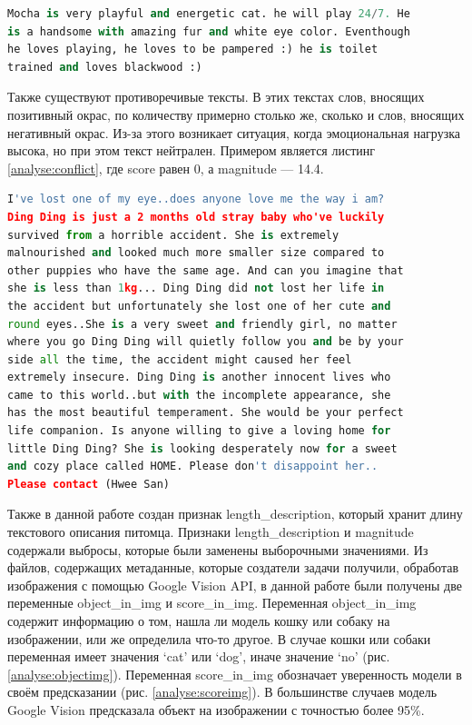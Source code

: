 \documentclass[14pt]{mmcs_article}
\begin{document}
\begin{lstlisting}[language=Python, caption={Пример позитивно окрашенного текста}, label=analyse:pos]
Mocha is very playful and energetic cat. he will play 24/7. He 
is a handsome with amazing fur and white eye color. Eventhough 
he loves playing, he loves to be pampered :) he is toilet 
trained and loves blackwood :)
\end{lstlisting}

Также существуют противоречивые тексты. В этих текстах слов, вносящих позитивный окрас, по количеству примерно столько же, сколько и слов, вносящих негативный окрас. Из-за этого возникает ситуация, когда эмоциональная нагрузка высока, но при этом текст нейтрален. Примером является листинг \ref{analyse:conflict}, где score равен 0, а magnitude — 14.4.

\begin{lstlisting}[language=Python, caption={Пример противоречивого текста}, label=analyse:conflict]
I've lost one of my eye..does anyone love me the way i am? 
Ding Ding is just a 2 months old stray baby who've luckily 
survived from a horrible accident. She is extremely 
malnourished and looked much more smaller size compared to 
other puppies who have the same age. And can you imagine that 
she is less than 1kg... Ding Ding did not lost her life in 
the accident but unfortunately she lost one of her cute and 
round eyes..She is a very sweet and friendly girl, no matter 
where you go Ding Ding will quietly follow you and be by your 
side all the time, the accident might caused her feel 
extremely insecure. Ding Ding is another innocent lives who 
came to this world..but with the incomplete appearance, she 
has the most beautiful temperament. She would be your perfect 
life companion. Is anyone willing to give a loving home for 
little Ding Ding? She is looking desperately now for a sweet 
and cozy place called HOME. Please don't disappoint her.. 
Please contact (Hwee San)
\end{lstlisting}

Также в данной работе создан признак length\_description, который хранит длину текстового описания питомца. Признаки length\_description и magnitude содержали выбросы, которые были заменены выборочными значениями.
Из файлов, содержащих метаданные, которые создатели задачи получили, обработав изображения с помощью Google Vision API, в данной работе были получены две переменные object\_in\_img и score\_in\_img. Переменная object\_in\_img содержит информацию о том, нашла ли модель кошку или собаку на изображении, или же определила что-то другое. В случае кошки или собаки переменная имеет значения `cat' или `dog', иначе значение `no' (рис. \ref{analyse:objectimg}). Переменная score\_in\_img обозначает уверенность модели в своём предсказании (рис. \ref{analyse:scoreimg}). В большинстве случаев модель Google Vision предсказала объект на изображении с точностью более 95\%.
\end{document}

